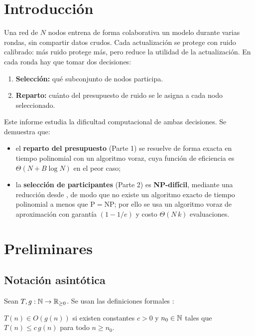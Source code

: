\section{Introducción}

Una red de $N$ nodos entrena de forma colaborativa un modelo durante varias rondas, sin compartir datos crudos. Cada actualización se protege con ruido calibrado: más ruido protege más, pero reduce la utilidad de la actualización. En cada ronda hay que tomar dos decisiones:
\begin{enumerate}
  \item \textbf{Selección:} qué subconjunto de nodos participa.
  \item \textbf{Reparto:} cuánto del presupuesto de ruido se le asigna a cada nodo seleccionado.
\end{enumerate}

Este informe estudia la dificultad computacional de ambas decisiones. Se demuestra que:
\begin{itemize}
  \item el \textbf{reparto del presupuesto} (Parte 1) se resuelve de forma exacta en tiempo polinomial con un algoritmo voraz, cuya función de eficiencia es $\Theta(N + B\log N)$ en el peor caso;
  \item la \textbf{selección de participantes} (Parte 2) es \textbf{NP-difícil}, mediante una reducción desde \MC{}, de modo que no existe un algoritmo exacto de tiempo polinomial a menos que $\mathrm{P}=\mathrm{NP}$; por ello se usa un algoritmo voraz de aproximación con garantía $(1-1/e)$ y costo $\Theta(N\,k)$ evaluaciones.
\end{itemize}

\section{Preliminares}

\subsection{Notación asintótica}

Sean $T, g : \mathbb{N} \to \mathbb{R}_{\ge 0}$. Se usan las definiciones formales \parencite{cormen2009}:

\begin{definicion}
$T(n) \in O(g(n))$ si existen constantes $c > 0$ y $n_0 \in \mathbb{N}$ tales que $T(n) \le c\, g(n)$ para todo $n \ge n_0$.
\end{definicion}

